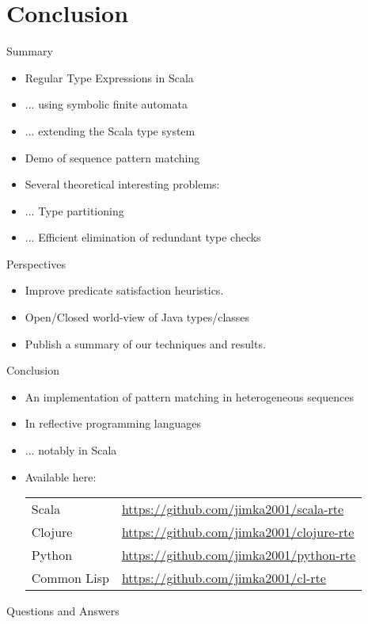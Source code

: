 \section{Conclusion}

{  %
\begin{frame}{Summary}
  \begin{itemize}
  \item Regular Type Expressions in Scala
  \item ... using symbolic finite automata
  \item ... extending the Scala type system
  \item Demo of sequence pattern matching
  \item Several theoretical interesting problems:
  \item ... Type partitioning
  \item ... Efficient elimination of redundant type checks
  \end{itemize}
\end{frame}
}

\begin{frame}{Perspectives}
  \begin{itemize}
  \item Improve predicate satisfaction heuristics.
  \item Open/Closed world-view of Java types/classes
  \item Publish a summary of our techniques and results.
  \end{itemize}
\end{frame}

\begin{frame}{Conclusion}
  \begin{itemize}
  \item An implementation of pattern matching in heterogeneous sequences
  \item In reflective programming languages
  \item ... notably in Scala
  \item Available here:

    \medskip
    
    \begin{tabular}{ll}
    Scala & \url{https://github.com/jimka2001/scala-rte}\\
    Clojure & \url{https://github.com/jimka2001/clojure-rte}\\
    Python & \url{https://github.com/jimka2001/python-rte}\\
    Common Lisp & \url{https://github.com/jimka2001/cl-rte}    
  \end{tabular}
  \end{itemize}
\end{frame}

\begin{frame}{Questions and Answers}
\end{frame}
